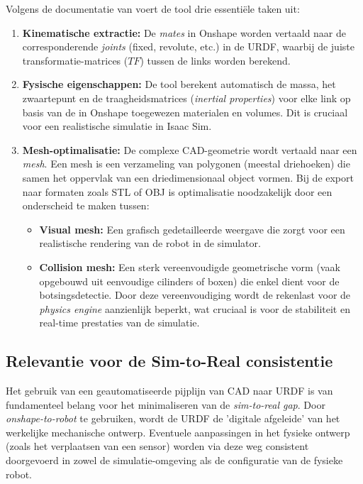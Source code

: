 Volgens de documentatie van \textcite{Rhoban2025} voert de tool drie essentiële taken uit:
\begin{enumerate}
\item \textbf{Kinematische extractie:} De \textit{mates} in Onshape worden vertaald naar de corresponderende \textit{joints} (fixed, revolute, etc.) in de URDF, waarbij de juiste transformatie-matrices ($TF$) tussen de links worden berekend.
\item \textbf{Fysische eigenschappen:} De tool berekent automatisch de massa, het zwaartepunt en de traagheidsmatrices (\textit{inertial properties}) voor elke link op basis van de in Onshape toegewezen materialen en volumes. Dit is cruciaal voor een realistische simulatie in Isaac Sim.
\item \textbf{Mesh-optimalisatie:} De complexe CAD-geometrie wordt vertaald naar een \textit{mesh}. Een mesh is een verzameling van polygonen (meestal driehoeken) die samen het oppervlak van een driedimensionaal object vormen. Bij de export naar formaten zoals STL of OBJ is optimalisatie noodzakelijk door een onderscheid te maken tussen:
    \begin{itemize}
        \item \textbf{Visual mesh:} Een grafisch gedetailleerde weergave die zorgt voor een realistische rendering van de robot in de simulator.
        \item \textbf{Collision mesh:} Een sterk vereenvoudigde geometrische vorm (vaak opgebouwd uit eenvoudige cilinders of boxen) die enkel dient voor de botsingsdetectie. Door deze vereenvoudiging wordt de rekenlast voor de \textit{physics engine} aanzienlijk beperkt, wat cruciaal is voor de stabiliteit en real-time prestaties van de simulatie.
    \end{itemize}
\end{enumerate}

\subsection{Relevantie voor de Sim-to-Real consistentie}
Het gebruik van een geautomatiseerde pijplijn van CAD naar URDF is van fundamenteel belang voor het minimaliseren van de \textit{sim-to-real gap}. Door \textit{onshape-to-robot} te gebruiken, wordt de URDF de 'digitale afgeleide' van het werkelijke mechanische ontwerp. Eventuele aanpassingen in het fysieke ontwerp (zoals het verplaatsen van een sensor) worden via deze weg consistent doorgevoerd in zowel de simulatie-omgeving als de configuratie van de fysieke robot.

